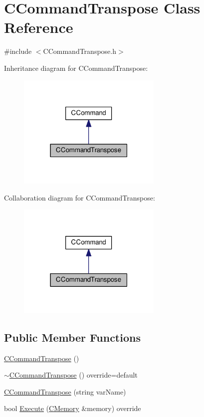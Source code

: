 \hypertarget{classCCommandTranspose}{}\section{C\+Command\+Transpose Class Reference}
\label{classCCommandTranspose}


{\ttfamily \#include $<$C\+Command\+Transpose.\+h$>$}



Inheritance diagram for C\+Command\+Transpose\+:\nopagebreak
\begin{figure}[H]
\begin{center}
\leavevmode
\includegraphics[width=195pt]{classCCommandTranspose__inherit__graph}
\end{center}
\end{figure}


Collaboration diagram for C\+Command\+Transpose\+:\nopagebreak
\begin{figure}[H]
\begin{center}
\leavevmode
\includegraphics[width=195pt]{classCCommandTranspose__coll__graph}
\end{center}
\end{figure}
\subsection*{Public Member Functions}
\begin{DoxyCompactItemize}
\item 
\hyperlink{classCCommandTranspose_aac4a85c15491ecafd4963163b2a63670}{C\+Command\+Transpose} ()
\item 
\hyperlink{classCCommandTranspose_a5aa1525bca08133891e869631ec66144}{$\sim$\+C\+Command\+Transpose} () override=default
\item 
\hyperlink{classCCommandTranspose_ac4c0687d585f237993e679453ced64ae}{C\+Command\+Transpose} (string var\+Name)
\item 
bool \hyperlink{classCCommandTranspose_aa422d6b8bbe3efb23bcc479646392238}{Execute} (\hyperlink{classCMemory}{C\+Memory} \&memory) override
\end{DoxyCompactItemize}
